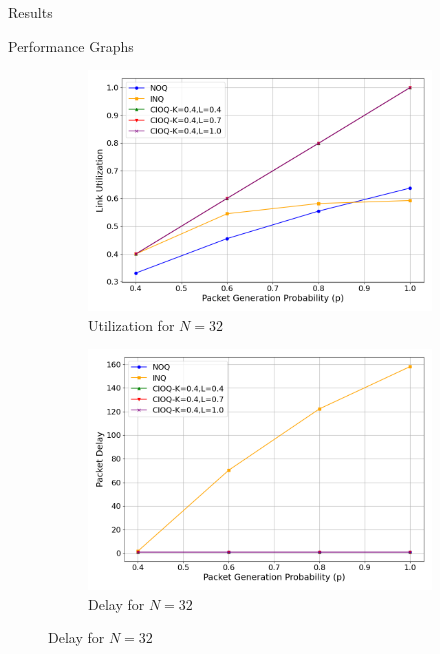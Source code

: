 \begin{section}{Results}
\begin{subsection}{Performance Graphs}
    \begin{figure}[htbp]
        \centering
        \begin{subfigure}{0.45\textwidth}
            \centering
            \includegraphics[width=\linewidth]{./figures/fig2/utilization_plot_N_32.png}
            \caption{Utilization for \(N = 32\)}
            \label{fig:utilization_32}
        \end{subfigure}
        \hfill
        \begin{subfigure}{0.45\textwidth}
            \centering
            \includegraphics[width=\linewidth]{./figures/fig2/delay_plot_N_32.png}
            \caption{Delay for \(N = 32\)}
            \label{fig:delay_32}
        \end{subfigure}

        \vspace{0.5cm} %


\end{figure}
\end{subsection}
\end{section}

